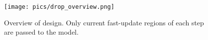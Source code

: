 \begin{figure}[htbp]
        \centering
        \texttt{[image: pics/drop\_overview.png]}
        \caption{Overview of \ourmethod{} design. Only current fast-update regions of each step are passed to the model.}
        \label{fig:drop_overview}
\end{figure}






